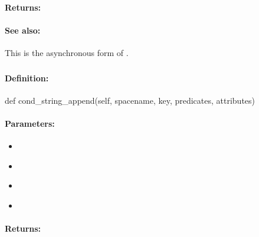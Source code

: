 \paragraph{Returns:}


\paragraph{See also:}  This is the asynchronous form of .

\pagebreak
\subsubsection{}
\label{api:python:cond_string_append}


\paragraph{Definition:}
\begin{pythoncode}
def cond_string_append(self, spacename, key, predicates, attributes)
\end{pythoncode}

\paragraph{Parameters:}
\begin{itemize}[noitemsep]
\item {}\\

\item {}\\

\item {}\\

\item {}\\

\end{itemize}

\paragraph{Returns:}



